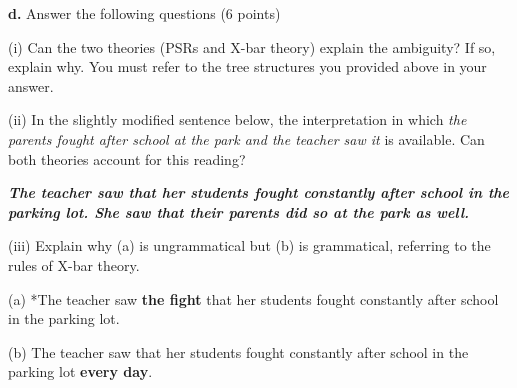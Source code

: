 \documentclass{article}
\begin{document}
\newpage
\noindent \textbf{d.} Answer the following questions (6 points) \par
\bigskip \noindent (i) Can the two theories (PSRs and X-bar theory) explain the ambiguity? If so, explain why. You must refer to the tree structures you provided above in your answer. \par
\vspace{1.5cm}
\noindent (ii) In the slightly modified sentence below, the interpretation in which \textit{the parents fought after school at the park and the teacher saw it} is available. Can both theories account for this reading? \par
\medskip \noindent \textbf{\textit{The teacher saw that her students fought constantly after school in the parking lot. She saw that their parents did so at the park as well.}}\par
\vspace{1.5cm}
\noindent (iii) Explain why (a) is ungrammatical but (b) is grammatical, referring to the rules of X-bar theory.\par
\medskip \noindent (a) *The teacher saw \textbf{the fight} that her students fought constantly after school in the parking lot.\par
\medskip \noindent (b) The teacher saw that her students fought constantly after school in the parking lot \textbf{every day}.

\newpage
\end{document}
